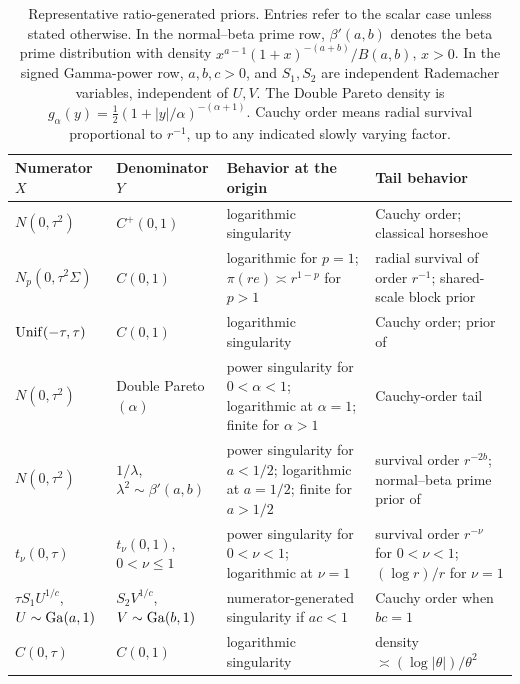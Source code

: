 \begin{table}[htbp]
\centering
\small
\renewcommand{\arraystretch}{1.25}
\begin{tabular}{@{}
>{\raggedright\arraybackslash}p{}
>{\raggedright\arraybackslash}p{}
>{\raggedright\arraybackslash}p{}
>{\raggedright\arraybackslash}p{}@{}}
\hline
Numerator $X$ & Denominator $Y$ & Behavior at the origin & Tail behavior \\ \hline
$N(0,\tau^2)$
& $C^+(0,1)$
& logarithmic singularity
& Cauchy order; classical horseshoe \\
$N_p(0,\tau^2\Sigma)$
& $C(0,1)$
& logarithmic for $p=1$; $\pi(re)\asymp r^{1-p}$ for $p>1$
& radial survival of order $r^{-1}$; shared-scale block prior \\
${\rm Unif}(-\tau,\tau)$
& $C(0,1)$
& logarithmic singularity
& Cauchy order; prior of \citet{Bhadra2021} \\
$N(0,\tau^2)$
& Double Pareto$(\alpha)$
& power singularity for $0<\alpha<1$; logarithmic at $\alpha=1$; finite for $\alpha>1$
& Cauchy-order tail \\
$N(0,\tau^2)$
& $1/\lambda$,~ $\lambda^2\sim\beta'(a,b)$
& power singularity for $a<1/2$; logarithmic at $a=1/2$; finite for $a>1/2$
& survival order $r^{-2b}$; normal--beta prime prior of \citet{BaiGhosh2019, BaiGhosh2021} \\
$t_\nu(0,\tau)$
& $t_\nu(0,1)$, $0<\nu\leq1$
& power singularity for $0<\nu<1$; logarithmic at $\nu=1$
& survival order $r^{-\nu}$ for $0<\nu<1$; $(\log r)/r$ for $\nu=1$ \\
$\tau S_1U^{1/c}$, $U\sim{\rm Ga}(a,1)$
& $S_2V^{1/c}$, $V\sim{\rm Ga}(b,1)$
& numerator-generated singularity if $ac<1$
& Cauchy order when $bc=1$ \\
$C(0,\tau)$
& $C(0,1)$
& logarithmic singularity
& density $\asymp(\log|\theta|)/\theta^2$ \\ \hline
\end{tabular}
\caption{Representative ratio-generated priors. Entries refer to the
scalar case unless stated otherwise. In the normal--beta prime row,
$\beta'(a,b)$ denotes the beta prime distribution with density
$x^{a-1}(1+x)^{-(a+b)}/B(a,b)$, $x>0$. In the signed Gamma-power row,
$a,b,c>0$, and $S_1,S_2$ are independent Rademacher variables,
independent of $U,V$. The Double Pareto density is
$g_\alpha(y)=\frac12(1+|y|/\alpha)^{-(\alpha+1)}$. Cauchy order means
radial survival proportional to $r^{-1}$, up to any indicated slowly
varying factor.}
\label{tab:ratio_examples}
\end{table}
